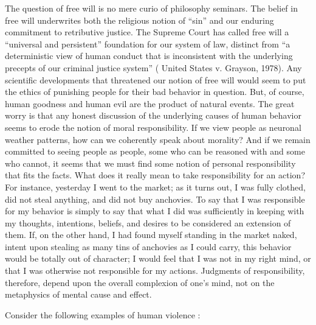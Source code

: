 \documentclass[a4paper,14pt]{extbook}
\begin{document}
The question of free will is no mere curio of philosophy seminars.
The belief in free will underwrites both the religious notion of ``sin'' and our enduring commitment to retributive justice.
The Supreme Court has called free will a ``universal and persistent'' foundation for our system of law, distinct from ``a deterministic view of human conduct that is inconsistent with the underlying precepts of our criminal justice system'' ( United States v. Grayson, 1978).
Any scientific developments that threatened our notion of free will would seem to put the ethics of punishing people for their bad behavior in question.
But, of course, human goodness and human evil are the product of natural events.
The great worry is that any honest discussion of the underlying causes of human behavior seems to erode the notion of moral responsibility.
If we view people as neuronal weather patterns, how can we coherently speak about morality?
And if we remain committed to seeing people as people, some who can be reasoned with and some who cannot, it seems that we must find some notion of personal responsibility that fits the facts.
What does it really mean to take responsibility for an action?
For instance, yesterday I went to the market;
as it turns out, I was fully clothed, did not steal anything, and did not buy anchovies.
To say that I was responsible for my behavior is simply to say that what I did was sufficiently in keeping with my thoughts, intentions, beliefs, and desires to be considered an extension of them.
If, on the other hand, I had found myself standing in the market naked, intent upon stealing as many tins of anchovies as I could carry, this behavior would be totally out of character;
I would feel that I was not in my right mind, or that I was otherwise not responsible for my actions.
Judgments of responsibility, therefore, depend upon the overall complexion of one’s mind, not on the metaphysics of mental cause and effect.

Consider the following examples of human violence :
\end{document}
